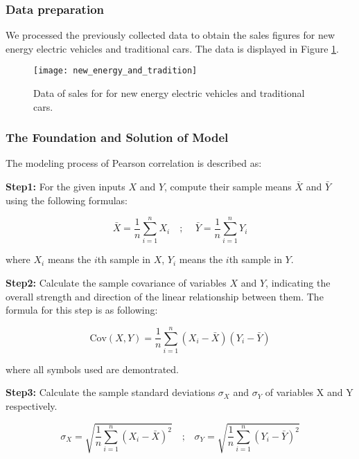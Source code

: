 \documentclass{apmcmthesis}
\begin{document}
\subsubsection{Data preparation}

We processed the previously collected data to obtain the sales figures for new energy electric vehicles and traditional cars. The data is displayed in Figure \ref{figure 4}.

\begin{figure}[htbp]
	\centering
	\texttt{[image: new\_energy\_and\_tradition]}
	\caption{Data of sales for for new energy electric vehicles and traditional cars.}
	\label{figure 4}
\end{figure}

\subsubsection{The Foundation and Solution of Model}

The modeling process of Pearson correlation is described as:

\textbf{Step1: }For the given inputs ${X}$ and ${Y}$, compute their sample means $\bar{X}$ and $\bar{Y}$ using the following formulas:

\begin{equation}
	\bar{X} = \frac{1}{n} \sum_{i=1}^{n} X_i \quad \text{; } \quad \bar{Y} = \frac{1}{n} \sum_{i=1}^{n} Y_i
\end{equation}

where $X_i$ means the $i$th sample in $X$, $Y_i$ means the $i$th sample in $Y$.

\textbf{Step2: }Calculate the sample covariance of variables $X$ and $Y$, indicating the overall strength and direction of the linear relationship between them. The formula for this step is as following:

\begin{equation}
	\text{Cov}(X, Y) = \frac{1}{n} \sum_{i=1}^{n} (X_i - \bar{X}) (Y_i - \bar{Y})
\end{equation}

where all symbols used are demontrated.

\textbf{Step3: }Calculate the sample standard deviations $\sigma_X$ and $\sigma_Y$ of variables X and Y respectively.

\begin{equation}
	\sigma_X = \sqrt{\frac{1}{n} \sum_{i=1}^{n} (X_i - \bar{X})^2} \quad \text{;} \quad \sigma_Y = \sqrt{\frac{1}{n} \sum_{i=1}^{n} (Y_i - \bar{Y})^2}
\end{equation}
\end{document}
